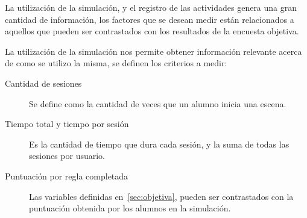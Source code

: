 La utilización de la simulación, y el registro de las actividades genera una
gran cantidad de información, los factores que se desean medir están
relacionados a aquellos que pueden ser contrastados con los resultados de la
encuesta objetiva.

La utilización de la simulación nos permite obtener información relevante acerca
de como se utilizo la misma, se definen los criterios a medir:

\begin{description}

\item[Cantidad de sesiones] Se define como la cantidad de veces que un alumno
    inicia una escena. 

\item[Tiempo total y tiempo por sesión] Es la cantidad de tiempo que dura cada
    sesión, y la suma de todas las sesiones por usuario.

\item[Puntuación por regla completada] Las variables definidas
    en~\ref{sec:objetiva}, pueden ser contrastados con la puntuación obtenida
    por los alumnos en la simulación.

\end{description}

